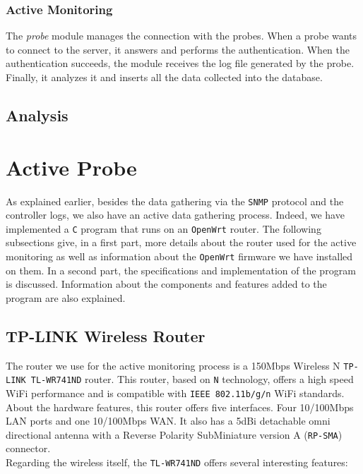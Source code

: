 \subsubsection{Active Monitoring}
The \emph{probe} module manages the connection with the probes. When a probe wants to connect to the server, it answers and performs the authentication. When the authentication succeeds, the module receives the log file generated by the probe. Finally, it analyzes it and inserts all the data collected into the database.

\subsection{Analysis}

\section{Active Probe}
As explained earlier, besides the data gathering via the \texttt{SNMP} protocol and the controller logs, we also have an active data gathering process. Indeed, we have implemented a \texttt{C} program that runs on an \texttt{OpenWrt} router. The following subsections give, in a first part, more details about the router used for the active monitoring as well as information about the \texttt{OpenWrt} firmware we have installed on them. In a second part, the specifications and implementation of the program is discussed. Information about the components and features added to the program are also explained.\\


\subsection{TP-LINK Wireless Router}
The router we use for the active monitoring process is a 150Mbps Wireless N \texttt{TP-LINK TL-WR741ND} router. This router, based on \texttt{N} technology, offers a high speed WiFi performance and is compatible with \texttt{IEEE 802.11b/g/n} WiFi standards. \\
About the hardware features, this router offers five interfaces. Four 10/100Mbps LAN ports and one 10/100Mbps WAN. It also has a 5dBi detachable omni directional antenna with a Reverse Polarity SubMiniature version A (\texttt{RP-SMA}) connector.\\
Regarding the wireless itself, the \texttt{TL-WR741ND} offers several interesting features\cite{tplink}:

